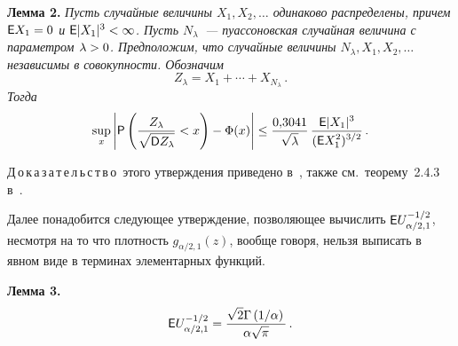 \begin{multicols}{2}
\medskip

\noindent
\textbf{Лемма 2.} \textit{Пусть случайные величины $X_1,X_2,\ldots$
одинаково распределены, причем ${\sf E}X_1\hm=0$ и ${\sf E}|X_1|^3\hm<\infty$. 
Пусть $N_{\lambda}$~--- пуассоновская случайная
величина с параметром $\lambda\hm>0$. Предположим, что случайные
величины $N_{\lambda},X_1,X_2,\ldots$ независимы в совокупности.
Обозначим}
$$
Z_{\lambda}=X_1+\cdots+X_{N_{\lambda}}\,.
$$
\textit{Тогда}
$$
\sup\limits_x\left\vert {\sf P}\left(\displaystyle\frac{\displaystyle Z_{\lambda}\mathstrut}{\displaystyle \sqrt{{\sf D}Z_{\lambda}}\mathstrut}<x \right)-
\Phi(x)\right\vert\le\displaystyle\frac{\displaystyle 0{,}3041\mathstrut}{\displaystyle \sqrt{\lambda}\mathstrut}\,\displaystyle\frac{\displaystyle {\sf E}|X_1|^3\mathstrut}{\displaystyle ({\sf E}X_1^2)^{3/2}\mathstrut}\,.
$$

\smallskip

\noindent
Д\,о\,к\,а\,з\,а\,т\,е\,л\,ь\,с\,т\,в\,о\ этого утверждения приведено 
в~\cite{KorolevShevtsova2010}, также см.\ теорему~2.4.3 в~\cite{KorolevBeningShorgin2011}.

\smallskip

Далее понадобится следующее утверждение, позволяющее вычислить ${\sf E}U_{\alpha/2,1}^{-1/2}$, 
несмотря на то что плот\-ность
$g_{\alpha/2,1}(z)$, вообще говоря, нельзя выписать в явном виде в
терминах элементарных функций.

\medskip

\noindent
\textbf{Лемма 3.}
\begin{equation*}
{\sf E}U_{\alpha/2,1}^{-1/2}=\displaystyle\frac{\displaystyle \sqrt{2}\Gamma\left({1}/{\alpha}\right)\mathstrut}{\displaystyle \alpha\sqrt{\pi}\mathstrut}\,.
\end{equation*}

\smallskip


\end{multicols}
